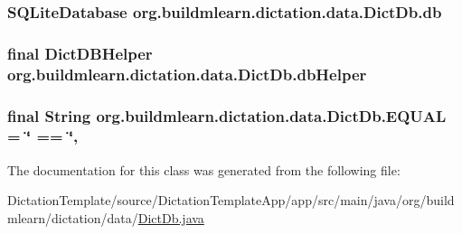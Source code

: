 \subsubsection[{\texorpdfstring{db}{db}}]{\setlength{\rightskip}{0pt plus 5cm}S\+Q\+Lite\+Database org.\+buildmlearn.\+dictation.\+data.\+Dict\+Db.\+db\hspace{0.3cm}{\ttfamily [private]}}\hypertarget{classorg_1_1buildmlearn_1_1dictation_1_1data_1_1DictDb_a2aa3deb66d74d970b61f80add55e9c00}{}\label{classorg_1_1buildmlearn_1_1dictation_1_1data_1_1DictDb_a2aa3deb66d74d970b61f80add55e9c00}
\subsubsection[{\texorpdfstring{db\+Helper}{dbHelper}}]{\setlength{\rightskip}{0pt plus 5cm}final Dict\+D\+B\+Helper org.\+buildmlearn.\+dictation.\+data.\+Dict\+Db.\+db\+Helper\hspace{0.3cm}{\ttfamily [private]}}\hypertarget{classorg_1_1buildmlearn_1_1dictation_1_1data_1_1DictDb_a3190b76f3c5b41ed1a1efd1fbb904177}{}\label{classorg_1_1buildmlearn_1_1dictation_1_1data_1_1DictDb_a3190b76f3c5b41ed1a1efd1fbb904177}
\subsubsection[{\texorpdfstring{E\+Q\+U\+AL}{EQUAL}}]{\setlength{\rightskip}{0pt plus 5cm}final String org.\+buildmlearn.\+dictation.\+data.\+Dict\+Db.\+E\+Q\+U\+AL = \char`\"{} == \char`\"{}\hspace{0.3cm}{\ttfamily [static]}, {\ttfamily [private]}}\hypertarget{classorg_1_1buildmlearn_1_1dictation_1_1data_1_1DictDb_aaad02877c23d7b290ffbee474e69790f}{}\label{classorg_1_1buildmlearn_1_1dictation_1_1data_1_1DictDb_aaad02877c23d7b290ffbee474e69790f}


The documentation for this class was generated from the following file\+:\begin{DoxyCompactItemize}
\item 
Dictation\+Template/source/\+Dictation\+Template\+App/app/src/main/java/org/buildmlearn/dictation/data/\hyperlink{DictDb_8java}{Dict\+Db.\+java}\end{DoxyCompactItemize}
